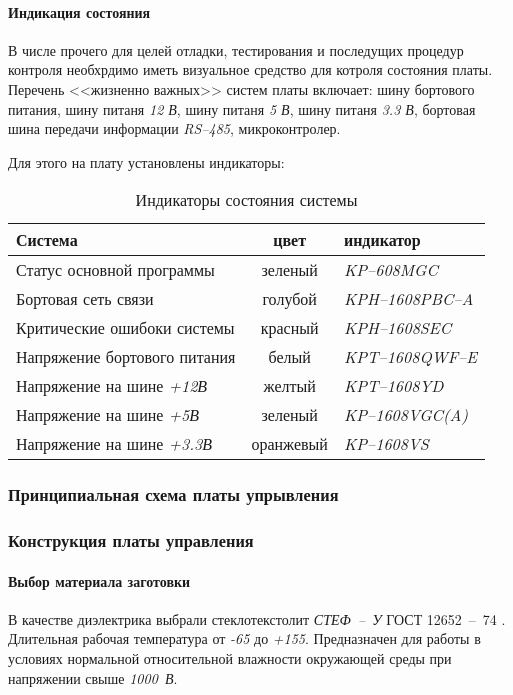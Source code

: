 \paragraph{Индикация состояния}
В числе прочего для целей отладки, тестирования и последущих процедур контроля
необхрдимо иметь визуальное средство для котроля состояния платы.
Перечень <<жизненно важных>> систем платы включает:
шину бортового питания,
шину питаня \textit{12  В},
шину питаня \textit{5   В},
шину питаня \textit{3.3 В},
бортовая шина передачи информации \textit{RS--485},
микроконтролер.

Для этого на плату установлены индикаторы:
\begin{table}[ht!]
    \centering
    \begin{tabular}{|l|c|l|}
        \hline
        Система & цвет & индикатор \\
        \hline
        Статус основной программы & зеленый & \textit{KP--608MGC} \\
        Бортовая сеть связи & голубой & \textit{KPH--1608PBC--A} \\
        Критические ошибоки системы & красный & \textit{KPH--1608SEC} \\
        Напряжение бортового питания & белый & \textit{KPT--1608QWF--E} \\
        Напряжение на шине \textit{+12В} & желтый & \textit{KPT--1608YD} \\
        Напряжение на шине \textit{+5В} & зеленый & \textit{KP--1608VGC(A)} \\
        Напряжение на шине \textit{+3.3В} & оранжевый & \textit{KP--1608VS} \\
        \hline
    \end{tabular}
    \caption{Индикаторы состояния системы}
    \label{boardIndication}
\end{table}

\subsubsection{Принципиальная схема платы упрывления}

\subsubsection{Конструкция платы управления}
\paragraph{Выбор материала заготовки}
В качестве диэлектрика выбрали стеклотекстолит
\textit{СТЕФ~--~У} ГОСТ 12652~--~74 \cite{GOST_12652_74}.
Длительная рабочая температура от \textit{-65\textcelsius}
до \textit{+155\textcelsius}.
Предназначен для работы в условиях нормальной относительной влажности
окружающей среды при напряжении свыше \textit{1000~В}.

